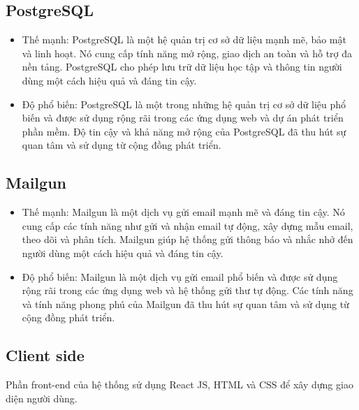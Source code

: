 \documentclass[../Thesis.tex]{subfiles}
\begin{document}
		\subsection{PostgreSQL}
			\begin{itemize}
				\item Thế mạnh: PostgreSQL là một hệ quản trị cơ sở dữ liệu mạnh mẽ, bảo mật và linh hoạt. Nó cung cấp tính năng mở rộng, giao dịch an toàn và hỗ trợ đa nền tảng. PostgreSQL cho phép lưu trữ dữ liệu học tập và thông tin người dùng một cách hiệu quả và đáng tin cậy.
				\item Độ phổ biến: PostgreSQL là một trong những hệ quản trị cơ sở dữ liệu phổ biến và được sử dụng rộng rãi trong các ứng dụng web và dự án phát triển phần mềm. Độ tin cậy và khả năng mở rộng của PostgreSQL đã thu hút sự quan tâm và sử dụng từ cộng đồng phát triển.
			\end{itemize}

		\subsection{Mailgun}
			\begin{itemize}
				\item Thế mạnh: Mailgun là một dịch vụ gửi email mạnh mẽ và đáng tin cậy. Nó cung cấp các tính năng như gửi và nhận email tự động, xây dựng mẫu email, theo dõi và phân tích. Mailgun giúp hệ thống gửi thông báo và nhắc nhở đến người dùng một cách hiệu quả và đáng tin cậy.
				\item Độ phổ biến: Mailgun là một dịch vụ gửi email phổ biến và được sử dụng rộng rãi trong các ứng dụng web và hệ thống gửi thư tự động. Các tính năng và tính năng phong phú của Mailgun đã thu hút sự quan tâm và sử dụng từ cộng đồng phát triển.
			\end{itemize}

	\subsection{Client side}
		Phần front-end của hệ thống sử dụng React JS, HTML và CSS để xây dựng giao diện người dùng. 
\end{document}
